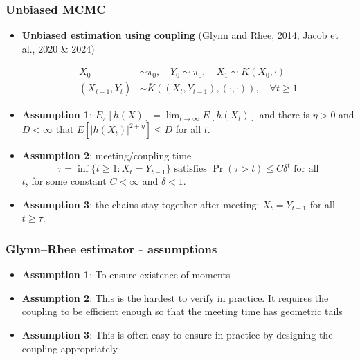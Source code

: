 \documentclass[aspectratio=169]{beamer}
\begin{document}
\begin{frame}
	\frametitle{Unbiased MCMC}

	\begin{itemize}
		\item \textbf{Unbiased estimation using coupling} (Glynn and Rhee, 2014, Jacob et al., 2020 \& 2024)

		      \begin{align*}
			      X_0            & \sim \pi_0, \quad Y_0 \sim \pi_0, \quad X_1 \sim K(X_0, \cdot)       \\
			      (X_{t+1}, Y_t) & \sim \bar{K}((X_t, Y_{t-1}), (\cdot, \cdot)), \quad \forall t \geq 1
		      \end{align*}

		\item \textbf{Assumption 1}: $E_\pi[h(X)] = \lim_{t \to \infty} E[h(X_t)]$ and there is $\eta > 0$ and $D < \infty$ that $E[|h(X_t)|^{2+\eta}] \leq D$ for all $t$.

		\item \textbf{Assumption 2}: meeting/coupling time
		      \[
			      \tau = \inf\{t \geq 1 : X_t = Y_{t-1}\} \text{ satisfies } \Pr(\tau > t) \leq C\delta^t \text{ for all}
		      \]
		      $t$, for some constant $C < \infty$ and $\delta < 1$.

		\item \textbf{Assumption 3}: the chains stay together after meeting: $X_t = Y_{t-1}$ for all $t \geq \tau$.

	\end{itemize}

\end{frame}

\begin{frame}
	\frametitle{Glynn--Rhee estimator - assumptions}
	\begin{itemize}
		\item \textbf{Assumption 1}: To ensure existence of moments
		\item \textbf{Assumption 2}: This is the hardest to verify in practice. It requires the coupling to be efficient enough so that the meeting time has geometric tails
		\item \textbf{Assumption 3}: This is often easy to ensure in practice by designing the coupling appropriately
	\end{itemize}
\end{frame}
\end{document}

